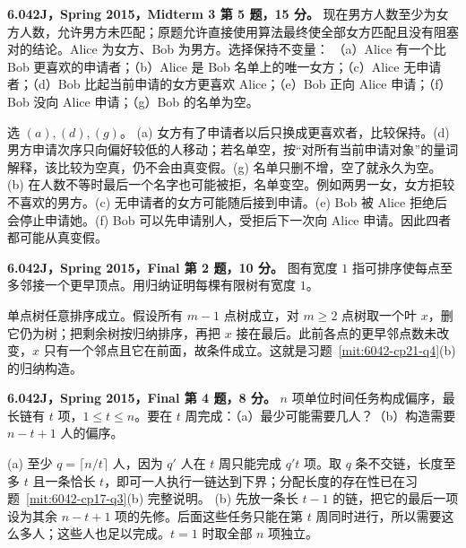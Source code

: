\begin{exercise}\label{mit:6042-mt3-q5}
\textbf{6.042J，Spring 2015，Midterm 3 第 5 题，15 分。}
现在男方人数至少为女方人数，允许男方未匹配；原题允许直接使用算法最终使全部女方匹配且没有阻塞对的结论。Alice 为女方、Bob 为男方。选择保持不变量：
（a）Alice 有一个比 Bob 更喜欢的申请者；（b）Alice 是 Bob 名单上的唯一女方；（c）Alice 无申请者；（d）Bob 比起当前申请的女方更喜欢 Alice；（e）Bob 正向 Alice 申请；（f）Bob 没向 Alice 申请；（g）Bob 的名单为空。
\end{exercise}
\begin{solution}
选 $(a),(d),(g)$。
(a) 女方有了申请者以后只换成更喜欢者，比较保持。(d) 男方申请次序只向偏好较低的人移动；若名单空，按“对所有当前申请对象”的量词解释，该比较为空真，仍不会由真变假。(g) 名单只删不增，空了就永久为空。
(b) 在人数不等时最后一个名字也可能被拒，名单变空。例如两男一女，女方拒较不喜欢的男方。(c) 无申请者的女方可能随后接到申请。(e) Bob 被 Alice 拒绝后会停止申请她。(f) Bob 可以先申请别人，受拒后下一次向 Alice 申请。因此四者都可能从真变假。
\end{solution}

\begin{exercise}\label{mit:6042-final-q2}
\textbf{6.042J，Spring 2015，Final 第 2 题，10 分。}
图有宽度 $1$ 指可排序使每点至多邻接一个更早顶点。用归纳证明每棵有限树有宽度 $1$。
\end{exercise}
\begin{solution}
单点树任意排序成立。假设所有 $m-1$ 点树成立，对 $m\ge2$ 点树取一个叶 $x$，删它仍为树；把剩余树按归纳排序，再把 $x$ 接在最后。此前各点的更早邻点数未改变，$x$ 只有一个邻点且它在前面，故条件成立。这就是习题~\ref{mit:6042-cp21-q4}(b) 的归纳构造。
\end{solution}

\begin{exercise}\label{mit:6042-final-q4}
\textbf{6.042J，Spring 2015，Final 第 4 题，8 分。}
$n$ 项单位时间任务构成偏序，最长链有 $t$ 项，$1\le t\le n$。要在 $t$ 周完成：（a）最少可能需要几人？（b）构造需要 $n-t+1$ 人的偏序。
\end{exercise}
\begin{solution}
(a) 至少 $q=\lceil n/t\rceil$ 人，因为 $q'$ 人在 $t$ 周只能完成 $q't$ 项。取 $q$ 条不交链，长度至多 $t$ 且一条恰长 $t$，即可一人执行一链达到下界；分配长度的存在性已在习题~\ref{mit:6042-cp17-q3}(b) 完整说明。
(b) 先放一条长 $t-1$ 的链，把它的最后一项设为其余 $n-t+1$ 项的先修。后面这些任务只能在第 $t$ 周同时进行，所以需要这么多人；这些人也足以完成。$t=1$ 时取全部 $n$ 项独立。
\end{solution}

